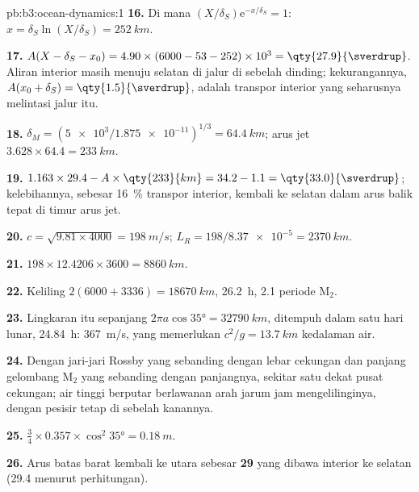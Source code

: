\begin{solution}{pb:b3:ocean-dynamics:1}
\textbf{16.} Di mana $(X/\delta_S)\mathrm e^{-x/\delta_S} = 1$: $x =
\delta_S\ln(X/\delta_S) = \qty{252}{km}$.

\textbf{17.} $A(X - \delta_S - x_0) = 4.90\times(6000 - 53 - 252)\times
10^3 = \qty{27.9}{\sverdrup}$. Aliran interior masih menuju selatan di
jalur di sebelah dinding; kekurangannya, $A(x_0 + \delta_S) =
\qty{1.5}{\sverdrup}$, adalah transpor interior yang seharusnya melintasi
jalur itu.

\textbf{18.} $\delta_M = (\num{5e3}/\num{1.875e-11})^{1/3} = \qty{64.4}{km}$;
arus jet $3.628\times64.4 = \qty{233}{km}$.

\textbf{19.} $1.163\times29.4 - A\times\qty{233}{km} = 34.2 - 1.1 =
\qty{33.0}{\sverdrup}$; kelebihannya, sebesar \qty{16}{\percent} transpor interior,
kembali ke selatan dalam arus balik tepat di timur arus jet.

\textbf{20.} $c = \sqrt{9.81\times4000} = \qty{198}{m/s}$; $L_R =
198/\num{8.37e-5} = \qty{2370}{km}$.

\textbf{21.} $198\times12.4206\times3600 = \qty{8860}{km}$.

\textbf{22.} Keliling $2(6000 + 3336) = \qty{18670}{km}$, \qty{26.2}{h},
2.1 periode M$_2$.

\textbf{23.} Lingkaran itu sepanjang $2\pi a\cos\ang{35} = \qty{32790}{km}$, ditempuh
dalam satu hari lunar, \qty{24.84}{h}: \qty{367}{m/s}, yang memerlukan $c^2/g =
\qty{13.7}{km}$ kedalaman air.

\textbf{24.} Dengan jari-jari Rossby yang sebanding dengan lebar cekungan
dan panjang gelombang M$_2$ yang sebanding dengan panjangnya, sekitar satu
 dekat pusat cekungan; air tinggi berputar berlawanan arah jarum jam
mengelilinginya, dengan pesisir tetap di sebelah kanannya.

\textbf{25.} $\tfrac34\times0.357\times\cos^2\ang{35} = \qty{0.18}{m}$.

\textbf{26.} Arus batas barat kembali ke utara sebesar
\textbf{\qty[text-series-to-math=true]{29}{\sverdrup}} yang dibawa interior ke selatan
(\qty{29.4}{\sverdrup} menurut perhitungan).
\end{solution}
